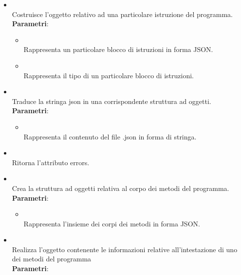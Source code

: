 \begin{itemize}
\begin{itemize}
\begin{itemize}
\end{itemize}
\item {}
\\ Costruisce l'oggetto relativo ad una particolare istruzione del programma.
\\ \textbf{Parametri}:
\begin{itemize}
\item {}
\\ Rappresenta un particolare blocco di istruzioni in forma JSON.
\item {}
\\ Rappresenta il tipo di un particolare blocco di istruzioni.
\end{itemize}
\item {}
\\ Traduce la stringa json in una corrispondente struttura ad oggetti.
\\ \textbf{Parametri}:
\begin{itemize}
\item {}
\\ Rappresenta il contenuto del file .json in forma di stringa.
\end{itemize}
\item {}
\\ Ritorna l'attributo errors.
\item {}
\\ Crea la struttura ad oggetti relativa al corpo dei metodi del programma.
\\ \textbf{Parametri}:
\begin{itemize}
\item {}
\\ Rappresenta l'insieme dei corpi dei metodi in forma JSON.
\end{itemize}
\item {}
\\ Realizza l'oggetto contenente le informazioni relative all'intestazione di uno dei metodi del programma
\\ \textbf{Parametri}:

\end{itemize}
\end{itemize}
